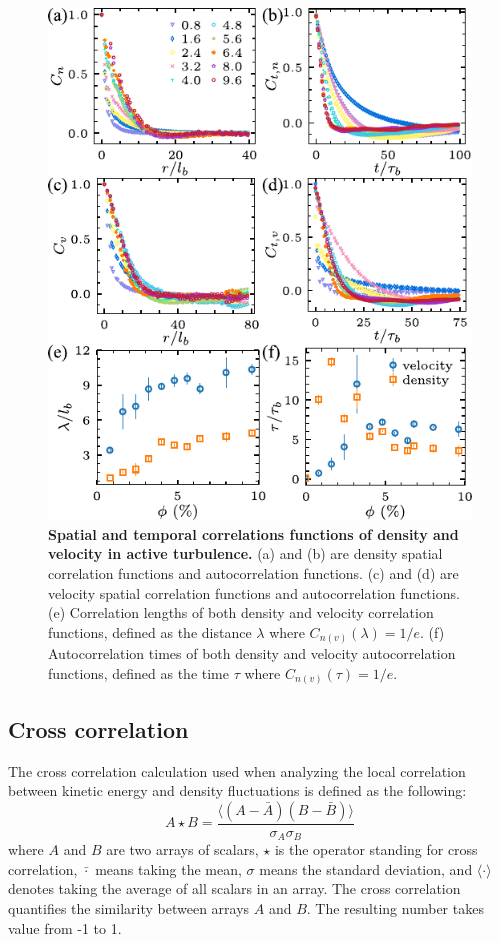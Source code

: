 \begin{figure}[!h]
\begin{center}
\includegraphics[width=4.5in]{figs/5-GNF/3.pdf}
\caption[Spatial and temporal correlation functions in active turbulence]
{
\textbf{Spatial and temporal correlations functions of density and velocity in active turbulence.}
(a) and (b) are density spatial correlation functions and autocorrelation functions.
(c) and (d) are velocity spatial correlation functions and autocorrelation functions.
(e) Correlation lengths of both density and velocity correlation functions, defined as the distance $\lambda$ where $C_{n(v)}(\lambda)=1/e$.
(f) Autocorrelation times of both density and velocity autocorrelation functions, defined as the time $\tau$ where $C_{n(v)}(\tau)=1/e$.
}
\label{fig:spatiotemporal-correlations}
\end{center}
\end{figure}

\subsection{Cross correlation}

The cross correlation calculation used when analyzing the local correlation between kinetic energy and density fluctuations is defined as the following:
\begin{equation}
\label{eq:cross-correlation}
A\star B = \frac{\langle(A-\bar A)(B-\bar B)\rangle}{\sigma_A\sigma_B}
\end{equation}
where $A$ and $B$ are two arrays of scalars, $\star$ is the operator standing for cross correlation, $\bar\cdot$ means taking the mean, $\sigma$ means the standard deviation, and $\langle\cdot\rangle$ denotes taking the average of all scalars in an array. The cross correlation quantifies the similarity between arrays $A$ and $B$. The resulting number takes value from -1 to 1.

